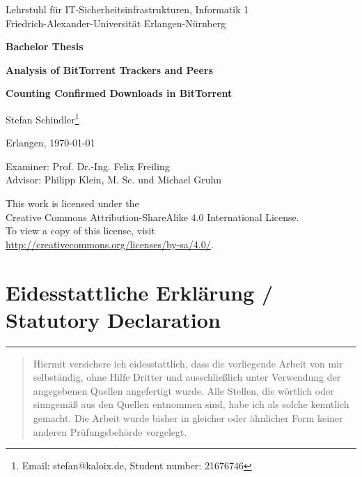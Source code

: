 \documentclass[10pt, a4paper, twoside]{scrartcl}
\renewcommand{\_}{\origunderscore\allowbreak}
\begin{document}
\begin{titlepage}
\begin{center}
\large{Lehrstuhl für IT-Sicherheitsinfrastrukturen, Informatik 1\\
Friedrich-Alexander-Universität Erlangen-Nürnberg}

\vspace{2cm}
\textbf{\Large{Bachelor Thesis}}

\vspace{1cm}
\textbf{\textsf{\huge{Analysis of BitTorrent Trackers and Peers}}}

\vspace{0.4cm}
\textbf{\textsf{\LARGE{Counting Confirmed Downloads in BitTorrent}}}

\vspace{1cm}
\Large{Stefan Schindler\footnote{Email: stefan@kaloix.de, Student number: 21676746}}

\vspace{1cm}
\Large{Erlangen, \today}

\vspace{6cm}
\large{Examiner: Prof. Dr.-Ing. Felix Freiling\\
Advisor: Philipp Klein, M. Sc. und Michael Gruhn}

\vspace{2cm}
\large{This work is licensed under the\\
Creative Commons Attribution-ShareAlike 4.0 International License.\\
To view a copy of this license, visit\\
\url{http://creativecommons.org/licenses/by-sa/4.0/}.}
\end{center}
\end{titlepage}
\cleardoublepage

\vspace*{\fill}
\section*{Eidesstattliche Erklärung / Statutory Declaration}

\vspace{0.1cm}
\noindent\hrule
\begin{quote}
Hiermit versichere ich eidesstattlich, dass die vorliegende Arbeit von mir
selbständig, ohne Hilfe Dritter und ausschließlich unter Verwendung der
angegebenen Quellen angefertigt wurde. Alle Stellen, die wörtlich oder
sinngemäß aus den Quellen entnommen sind, habe ich als solche kennt\-lich
gemacht. Die Arbeit wurde bisher in gleicher oder ähnlicher Form keiner anderen
Prüfungsbehörde vorgelegt.
\end{quote}
\end{document}
